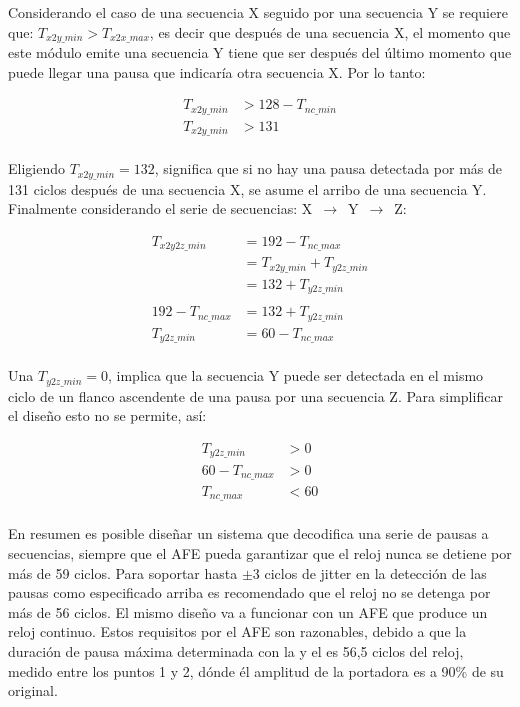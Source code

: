 \documentclass[a4paper, twoside, 11pt]{report}
\begin{document}
Considerando el caso de una secuencia X seguido por una secuencia Y se requiere que: $T_{x2y\_min} > T_{x2x\_max}$, es decir que después de una secuencia X, el momento que este módulo emite una secuencia Y tiene que ser después del último momento que puede llegar una pausa que indicaría otra secuencia X. Por lo tanto:

\begin{align*}
    T_{x2y\_min} &> 128 - T_{nc\_min} \\
    T_{x2y\_min} &> 131 \\
\end{align*}

Eligiendo $T_{x2y\_min} = 132$, significa que si no hay una pausa detectada por más de 131 ciclos después de una secuencia X, se asume el arribo de una secuencia Y. Finalmente considerando el serie de secuencias: X~$\rightarrow$~Y~$\rightarrow$~Z:

\begin{align*}
    T_{x2y2z\_min} &= 192 - T_{nc\_max} \\
               &= T_{x2y\_min} + T_{y2z\_min} \\
               &= 132 + T_{y2z\_min} \\
    \\
    192 - T_{nc\_max} &= 132 + T_{y2z\_min} \\
    T_{y2z\_min} &= 60 - T_{nc\_max} \\
\end{align*}

Una $T_{y2z\_min} = 0$, implica que la secuencia Y puede ser detectada en el mismo ciclo de un flanco ascendente de una pausa por una secuencia Z. Para simplificar el diseño esto no se permite, así:

\begin{align*}
    T_{y2z\_min} &> 0 \\
    60 - T_{nc\_max} &> 0 \\
    T_{nc\_max} &< 60 \\
\end{align*}

En resumen es posible diseñar un sistema que decodifica una serie de pausas a secuencias, siempre que el AFE pueda garantizar que el reloj nunca se detiene por más de 59 ciclos. Para soportar hasta $\pm 3$ ciclos de jitter en la detección de las pausas como especificado arriba es recomendado que el reloj no se detenga por más de 56 ciclos. El mismo diseño va a funcionar con un AFE que produce un reloj continuo. Estos requisitos por el AFE son razonables, debido a que la duración de pausa máxima determinada con la  y el  es 56,5 ciclos del reloj, medido entre los puntos 1 y 2, dónde él amplitud de la portadora es a 90\% de su original.
\end{document}
